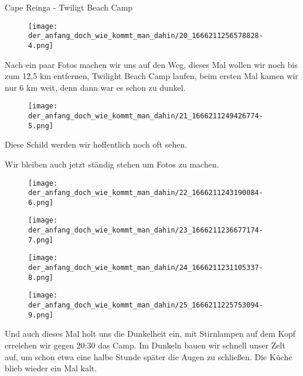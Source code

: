   Cape Reinga - Twiligt Beach Camp
 


\begin{figure}[H]
	\centering
	\texttt{[image: der\_anfang\_doch\_wie\_kommt\_man\_dahin/20\_1666211256578828-4.png]}
	\caption{}
	\label{fig:20_1666211256578828-4}
\end{figure}

  Nach ein paar Fotos machen wir uns auf den Weg, dieses Mal wollen wir noch bis zum 12,5 km entfernen, Twilight Beach Camp laufen, beim ersten Mal kamen wir nur 6 km weit, denn dann war es schon zu dunkel.
 


\begin{figure}[H]
	\centering
	\texttt{[image: der\_anfang\_doch\_wie\_kommt\_man\_dahin/21\_1666211249426774-5.png]}
	\caption{}
	\label{fig:21_1666211249426774-5}
\end{figure}

  Diese Schild werden wir hoffentlich noch oft sehen.
 


  Wir bleiben auch jetzt ständig stehen um Fotos zu machen.
 


\begin{figure}[H]
	\centering
	\texttt{[image: der\_anfang\_doch\_wie\_kommt\_man\_dahin/22\_1666211243190084-6.png]}
	\caption{}
	\label{fig:22_1666211243190084-6}
\end{figure}

\begin{figure}[H]
	\centering
	\texttt{[image: der\_anfang\_doch\_wie\_kommt\_man\_dahin/23\_1666211236677174-7.png]}
	\caption{}
	\label{fig:23_1666211236677174-7}
\end{figure}

\begin{figure}[H]
	\centering
	\texttt{[image: der\_anfang\_doch\_wie\_kommt\_man\_dahin/24\_1666211231105337-8.png]}
	\caption{}
	\label{fig:24_1666211231105337-8}
\end{figure}

\begin{figure}[H]
	\centering
	\texttt{[image: der\_anfang\_doch\_wie\_kommt\_man\_dahin/25\_1666211225753094-9.png]}
	\caption{}
	\label{fig:25_1666211225753094-9}
\end{figure}

  Und auch dieses Mal holt uns die Dunkelheit ein, mit Stirnlampen auf dem Kopf erreichen wir gegen 20:30 das Camp. Im Dunkeln bauen wir schnell unser Zelt auf, um schon etwa eine halbe Stunde später die Augen zu schließen. Die Küche blieb wieder ein Mal kalt.
 


